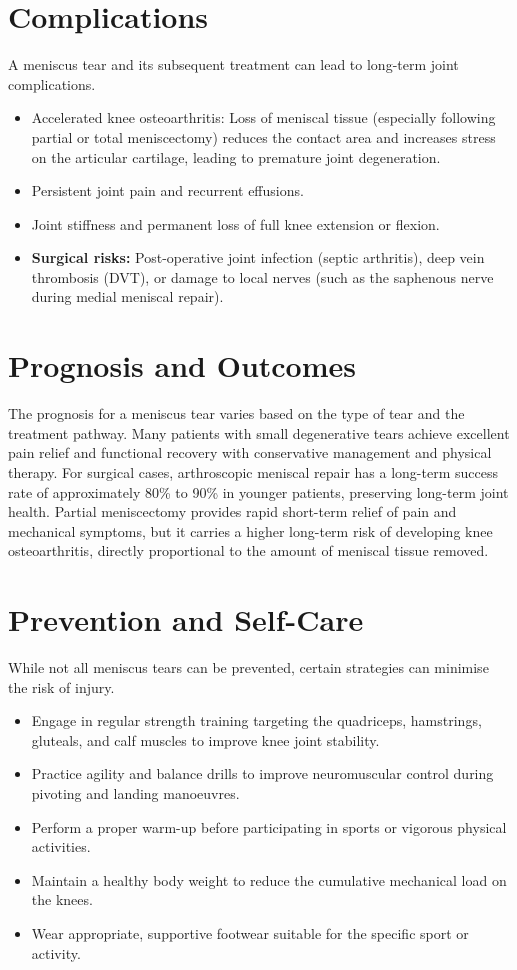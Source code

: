 \section*{Complications}
A meniscus tear and its subsequent treatment can lead to long-term joint complications.
\begin{itemize}
    \item Accelerated knee osteoarthritis: Loss of meniscal tissue (especially following partial or total meniscectomy) reduces the contact area and increases stress on the articular cartilage, leading to premature joint degeneration.
    \item Persistent joint pain and recurrent effusions.
    \item Joint stiffness and permanent loss of full knee extension or flexion.
    \item \textbf{Surgical risks:} Post-operative joint infection (septic arthritis), deep vein thrombosis (DVT), or damage to local nerves (such as the saphenous nerve during medial meniscal repair).
\end{itemize}

\section*{Prognosis and Outcomes}
The prognosis for a meniscus tear varies based on the type of tear and the treatment pathway. Many patients with small degenerative tears achieve excellent pain relief and functional recovery with conservative management and physical therapy. For surgical cases, arthroscopic meniscal repair has a long-term success rate of approximately 80\% to 90\% in younger patients, preserving long-term joint health. Partial meniscectomy provides rapid short-term relief of pain and mechanical symptoms, but it carries a higher long-term risk of developing knee osteoarthritis, directly proportional to the amount of meniscal tissue removed.

\section*{Prevention and Self-Care}
While not all meniscus tears can be prevented, certain strategies can minimise the risk of injury.
\begin{itemize}
    \item Engage in regular strength training targeting the quadriceps, hamstrings, gluteals, and calf muscles to improve knee joint stability.
    \item Practice agility and balance drills to improve neuromuscular control during pivoting and landing manoeuvres.
    \item Perform a proper warm-up before participating in sports or vigorous physical activities.
    \item Maintain a healthy body weight to reduce the cumulative mechanical load on the knees.
    \item Wear appropriate, supportive footwear suitable for the specific sport or activity.
\end{itemize}


